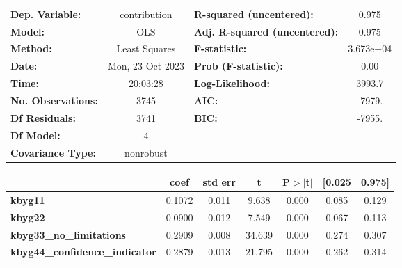 \begin{center}
\begin{tabular}{lclc}
\toprule
\textbf{Dep. Variable:}                &   contribution   & \textbf{  R-squared (uncentered):}      &     0.975   \\
\textbf{Model:}                        &       OLS        & \textbf{  Adj. R-squared (uncentered):} &     0.975   \\
\textbf{Method:}                       &  Least Squares   & \textbf{  F-statistic:       }          & 3.673e+04   \\
\textbf{Date:}                         & Mon, 23 Oct 2023 & \textbf{  Prob (F-statistic):}          &     0.00    \\
\textbf{Time:}                         &     20:03:28     & \textbf{  Log-Likelihood:    }          &    3993.7   \\
\textbf{No. Observations:}             &        3745      & \textbf{  AIC:               }          &    -7979.   \\
\textbf{Df Residuals:}                 &        3741      & \textbf{  BIC:               }          &    -7955.   \\
\textbf{Df Model:}                     &           4      & \textbf{                     }          &             \\
\textbf{Covariance Type:}              &    nonrobust     & \textbf{                     }          &             \\
\bottomrule
\end{tabular}
\begin{tabular}{lcccccc}
                                       & \textbf{coef} & \textbf{std err} & \textbf{t} & \textbf{P$> |$t$|$} & \textbf{[0.025} & \textbf{0.975]}  \\
\midrule
\textbf{kbyg11}                        &       0.1072  &        0.011     &     9.638  &         0.000        &        0.085    &        0.129     \\
\textbf{kbyg22}                        &       0.0900  &        0.012     &     7.549  &         0.000        &        0.067    &        0.113     \\
\textbf{kbyg33\_no\_limitations}       &       0.2909  &        0.008     &    34.639  &         0.000        &        0.274    &        0.307     \\
\textbf{kbyg44\_confidence\_indicator} &       0.2879  &        0.013     &    21.795  &         0.000        &        0.262    &        0.314     \\

\end{tabular}
\end{center}
